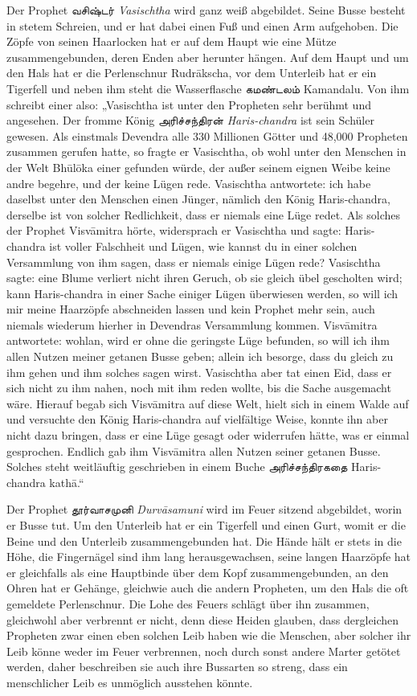 \documentclass{article}
\newcommand{\TamilText}[1]{\texttamil{#1}}
\newcommand{\tam}[1]{\TamilText{#1}}
\begin{document}
Der Prophet \tam{வசிஷ்டர்} \emph{Vasischtha} wird ganz weiß abgebildet. Seine Busse besteht in stetem Schreien, und er hat dabei einen Fuß und einen Arm aufgehoben. Die Zöpfe von seinen Haarlocken hat er auf dem Haupt wie eine Mütze zusammengebunden, deren Enden aber herunter hängen. Auf dem Haupt und um den Hals hat er die Perlenschnur Rudr\={a}kscha, vor dem Unterleib hat er ein Tigerfell und neben ihm steht die Wasserflasche \tam{கமண்டலம்} Kamandalu. Von ihm schreibt einer also: „Vasischtha ist unter den Propheten sehr berühmt und angesehen. Der fromme König \tam{அரிச்சந்திரன்} \emph{Haris-chandra} ist sein Schüler gewesen. Als einstmals Devendra alle 330 Millionen Götter und 48,000 Propheten zusammen gerufen hatte, so fragte er Vasischtha, ob wohl unter den Menschen in der Welt Bh\={u}l\={o}ka einer gefunden würde, der außer seinem eignen Weibe keine andre begehre, und der keine Lügen rede. Vasischtha antwortete: ich habe daselbst unter den Menschen einen Jünger, nämlich den König Haris-chandra, derselbe ist von solcher Redlichkeit, dass er niemals eine Lüge redet. Als solches der Prophet Visv\={a}mitra hörte, widersprach er Vasischtha und sagte: Haris-chandra ist voller Falschheit und Lügen, wie kannst du in einer solchen Versammlung von ihm sagen, dass er niemals einige Lügen rede? Vasischtha sagte: eine Blume verliert nicht ihren Geruch, ob sie gleich übel gescholten wird; kann Haris-chandra in einer Sache einiger Lügen überwiesen werden, so will ich mir meine Haarzöpfe abschneiden lassen und kein Prophet mehr sein, auch niemals wiederum hierher in Devendras Versammlung kommen. Visv\={a}mitra antwortete: wohlan, wird er ohne die geringste Lüge befunden, so will ich ihm allen Nutzen meiner getanen Busse geben; allein ich besorge, dass du gleich zu ihm gehen und ihm solches sagen wirst. Vasischtha aber tat einen Eid, dass er sich nicht zu ihm nahen, noch mit ihm reden wollte, bis die Sache ausgemacht wäre. Hierauf begab sich Visv\={a}mitra auf diese Welt, hielt sich in einem Walde auf und versuchte den König Haris-chandra auf vielfältige Weise, konnte ihn aber nicht dazu bringen, dass er eine Lüge gesagt oder widerrufen hätte, was er einmal gesprochen. Endlich gab ihm Visv\={a}mitra allen Nutzen seiner getanen Busse. Solches steht weitläuftig geschrieben in einem Buche \tam{அரிச்சந்திரகதை} Haris-chandra kath\={a}.“

Der Prophet \tam{தூர்வாசமுனி} \emph{Durv\={a}samuni} wird im Feuer sitzend abgebildet, worin er Busse tut. Um den Unterleib hat er ein Tigerfell und einen Gurt, womit er die Beine und den Unterleib zusammengebunden hat. Die Hände hält er stets in die Höhe, die Fingernägel sind ihm lang herausgewachsen, seine langen Haarzöpfe hat er gleichfalls als eine Hauptbinde über dem Kopf zusammengebunden, an den Ohren hat er Gehänge, gleichwie auch die andern Propheten, um den Hals die oft gemeldete Perlenschnur. Die Lohe des Feuers schlägt über ihn zusammen, gleichwohl aber verbrennt er nicht, denn diese Heiden glauben, dass dergleichen Propheten zwar einen eben solchen Leib haben wie die Menschen, aber solcher ihr Leib könne weder im Feuer verbrennen, noch durch sonst andere Marter getötet werden, daher beschreiben sie auch ihre Bussarten so streng, dass ein menschlicher Leib es unmöglich ausstehen könnte.
\end{document}
